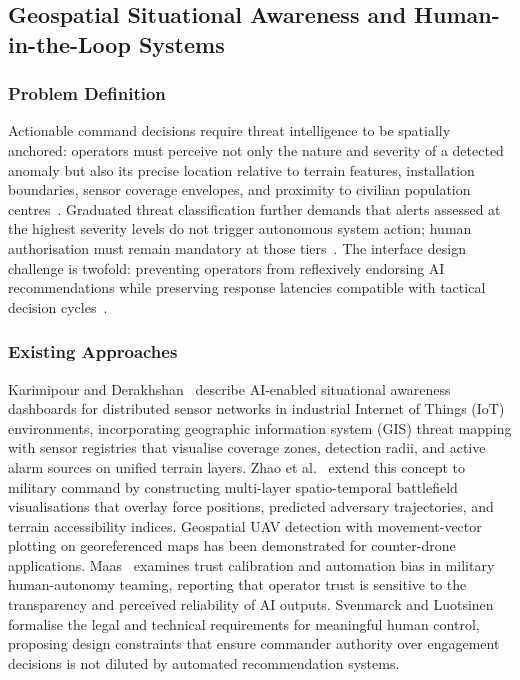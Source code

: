 \subsection{Geospatial Situational Awareness and Human-in-the-Loop Systems}
\label{sec:geospatial}

\subsubsection{Problem Definition}
Actionable command decisions require threat intelligence to be spatially anchored: operators must perceive not only the nature and severity of a detected anomaly but also its precise location relative to terrain features, installation boundaries, sensor coverage envelopes, and proximity to civilian population centres~\cite{karimipour2021iot}. Graduated threat classification further demands that alerts assessed at the highest severity levels do not trigger autonomous system action; human authorisation must remain mandatory at those tiers~\cite{meaningful2024hitl}. The interface design challenge is twofold: preventing operators from reflexively endorsing AI recommendations while preserving response latencies compatible with tactical decision cycles~\cite{hitl2023trust}.

\subsubsection{Existing Approaches}
Karimipour and Derakhshan~\cite{karimipour2021iot} describe AI-enabled situational awareness dashboards for distributed sensor networks in industrial Internet of Things (IoT) environments, incorporating geographic information system (GIS) threat mapping with sensor registries that visualise coverage zones, detection radii, and active alarm sources on unified terrain layers. Zhao et al.~\cite{zhao2022deepai} extend this concept to military command by constructing multi-layer spatio-temporal battlefield visualisations that overlay force positions, predicted adversary trajectories, and terrain accessibility indices. Geospatial UAV detection with movement-vector plotting on georeferenced maps has been demonstrated for counter-drone applications. Maas~\cite{hitl2023trust} examines trust calibration and automation bias in military human-autonomy teaming, reporting that operator trust is sensitive to the transparency and perceived reliability of AI outputs. Svenmarck and Luotsinen~\cite{meaningful2024hitl} formalise the legal and technical requirements for meaningful human control, proposing design constraints that ensure commander authority over engagement decisions is not diluted by automated recommendation systems.

